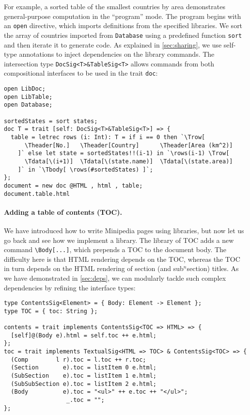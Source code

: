 For example, a sorted table of the smallest countries by area demonstrates
general-purpose computation in the ``program'' mode. The program begins with an
\lstinline{open} directive, which imports definitions from the specified
libraries. We sort the array of countries imported from \lstinline{Database}
using a predefined function \lstinline{sort} and then iterate it to generate
\ExT code. As explained in \autoref{sec:sharing}, we use self-type annotations
to inject dependencies on the library commands. The intersection type
\lstinline{DocSig<T>&TableSig<T>} allows \ExT commands from both compositional
interfaces to be used in the trait \lstinline{doc}:

\begin{lstlisting}
open LibDoc;
open LibTable;
open Database;

sortedStates = sort states;
doc T = trait [self: DocSig<T>&TableSig<T>] => {
  table = letrec rows (i: Int): T = if i == 0 then `\Trow[
      \Theader[No.]   \Theader[Country]      \Theader[Area (km^2)]
    ]` else let state = sortedStates!!(i-1) in `\rows(i-1) \Trow[
      \Tdata[\(i+1)]  \Tdata[\(state.name)]  \Tdata[\(state.area)]
    ]` in `\Tbody[ \rows(#sortedStates) ]`;
};
document = new doc @HTML , html , table;
document.table.html
\end{lstlisting}

\paragraph{Adding a table of contents (TOC).}
We have introduced how to write Minipedia pages using \ExT libraries, but now
let us go back and see how we implement a \ExT library. The library of TOC adds
a new command \lstinline{\Body[...]}, which prepends a TOC to the document body.
The difficulty here is that HTML rendering depends on the TOC, whereas the TOC
in turn depends on the HTML rendering of section (and sub$^n$section) titles. As
we have demonstrated in \autoref{sec:deps}, we can modularly tackle such complex
dependencies by refining the interface types:

\begin{lstlisting}
type ContentsSig<Element> = { Body: Element -> Element };
type TOC = { toc: String };

contents = trait implements ContentsSig<TOC => HTML> => {
  [self]@(Body e).html = self.toc ++ e.html;
};
toc = trait implements TextualSig<HTML => TOC> & ContentsSig<TOC> => {
  (Comp        l r).toc = l.toc ++ r.toc;
  (Section       e).toc = listItem 0 e.html;
  (SubSection    e).toc = listItem 1 e.html;
  (SubSubSection e).toc = listItem 2 e.html;
  (Body          e).toc = "<ul>" ++ e.toc ++ "</ul>";
                  _.toc = "";
};
\end{lstlisting}


